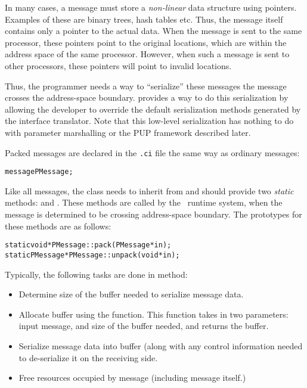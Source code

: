 
In many cases, a message must store a {\em non-linear} data structure using
pointers.  Examples of these are binary trees, hash tables etc. Thus, the
message itself contains only a pointer to the actual data. When the message is
sent to the same processor, these pointers point to the original locations,
which are within the address space of the same processor. However, when such a
message is sent to other processors, these pointers will point to invalid
locations.

Thus, the programmer needs a way to ``serialize'' these messages
 the
message crosses the address-space boundary.  \charmpp{} provides a way to do
this serialization by allowing the developer to override the default
serialization methods generated by the \charmpp{} interface translator.
Note that this low-level serialization has nothing to do with parameter
marshalling or the PUP framework described later.

Packed messages are declared in the {\tt .ci} file the same way as ordinary
messages:

\begin{alltt}
message PMessage;
\end{alltt}

Like all messages, the class  needs to inherit from
 and should provide two {\em static} methods: 
and . These methods are called by the \charmpp\ runtime system, when
the message is determined to be crossing address-space boundary. The prototypes
for these methods are as follows:

\begin{alltt}
static void *PMessage::pack(PMessage *in);
static PMessage *PMessage::unpack(void *in);
\end{alltt}

Typically, the following tasks are done in  method:

\begin{itemize}

\item Determine size of the buffer needed to serialize message data.

\item Allocate buffer using the  function. This function
takes in two parameters: input message, and size of the buffer needed, and
returns the buffer.

\item Serialize message data into buffer (along with any control information
needed to de-serialize it on the receiving side.

\item Free resources occupied by message (including message itself.)  

\end{itemize}

